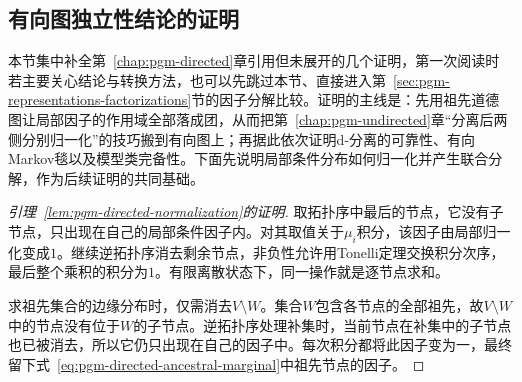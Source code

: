 \subsection{有向图独立性结论的证明}
\label{sec:pgm-representations-directed-proofs}

本节集中补全第~\ref{chap:pgm-directed}章引用但未展开的几个证明，第一次阅读时若主要关心结论与转换方法，也可以先跳过本节、直接进入第~\ref{sec:pgm-representations-factorizations}节的因子分解比较。证明的主线是：先用祖先道德图让局部因子的作用域全部落成团，从而把第~\ref{chap:pgm-undirected}章“分离后两侧分别归一化”的技巧搬到有向图上；再据此依次证明d-分离的可靠性、有向Markov毯以及模型类完备性。下面先说明局部条件分布如何归一化并产生联合分解，作为后续证明的共同基础。

\begin{proof}[引理~\ref{lem:pgm-directed-normalization}的证明]
取拓扑序中最后的节点，它没有子节点，只出现在自己的局部条件因子内。对其取值关于$\mu_i$积分，该因子由局部归一化变成$1$。继续逆拓扑序消去剩余节点，非负性允许用Tonelli定理交换积分次序，最后整个乘积的积分为$1$。有限离散状态下，同一操作就是逐节点求和。

求祖先集合的边缘分布时，仅需消去$V\setminus W$。集合$W$包含各节点的全部祖先，故$V\setminus W$中的节点没有位于$W$的子节点。逆拓扑序处理补集时，当前节点在补集中的子节点也已被消去，所以它仍只出现在自己的因子中。每次积分都将此因子变为一，最终留下式~\eqref{eq:pgm-directed-ancestral-marginal}中祖先节点的因子。
\end{proof}

